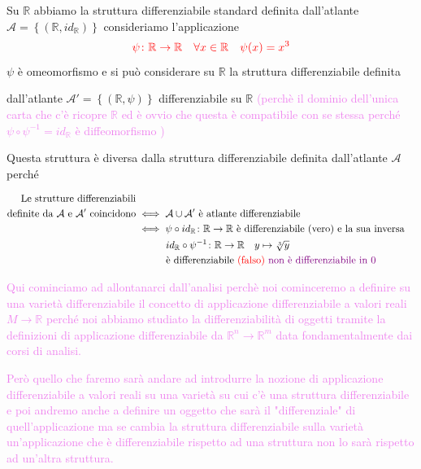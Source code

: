         \newpage 
        \begin{esempio}[$\mathbb{R}$]
        \mbox{}
        
        Su $\mathbb{R}$ abbiamo la struttura differenziabile standard definita dall'atlante $\mathcal{A}= \left\{(\mathbb{R} , id_{\mathbb{R}})\right\}$ consideriamo l'applicazione
        \[ \color{red} \psi \colon \mathbb{R} \to \mathbb{R} \quad \forall x \in \mathbb{R} \quad \psi (x) = x^3 \]
        $\psi$ è omeomorfismo e si può considerare su $\mathbb{R}$ la struttura differenziabile definita 

        dall'atlante $\mathcal{A}'= \left\{ \left( \mathbb{R}, \psi \right) \right\}$ differenziabile su $\mathbb{R}$ \textcolor{violet}{(perchè il dominio dell'unica carta
        che c'è ricopre $\mathbb{R}$ ed è ovvio che questa è compatibile con se stessa perché $\psi \circ \psi^{-1} = id_{\mathbb{R}}$ è diffeomorfismo )}

        Questa struttura è diversa dalla struttura differenziabile definita dall'atlante $\mathcal{A}$ perché

        \textcolor{verde}{$\begin{aligned}
        \text{Le strutture differenziabili} \\ \text{definite da } \mathcal{A} \text{ e } \mathcal{A}' \text{ coincidono} &\iff  \mathcal{A} \cup \mathcal{A}' \text{ è atlante differenziabile} \\
        &\iff \psi \circ id_{\mathbb{R}} \colon \mathbb{R} \to \mathbb{R} \text{ è differenziabile \textcolor{black}{(vero)} e la sua inversa} \\
        & \qquad \quad id_{\mathbb{R}} \circ \psi^{-1} \colon \mathbb{R} \to \mathbb{R} \quad y \mapsto \sqrt[3]{y} \\ 
        &\qquad \quad \text{è differenziabile \textcolor{red}{(falso)} \textcolor{violet}{non è differenziabile in 0}}
        \end{aligned}$}

        \textcolor{violet}{Qui cominciamo ad allontanarci dall'analisi perchè noi cominceremo a definire su una varietà differenziabile il concetto 
        di applicazione differenziabile a valori reali $M \to \mathbb{R}$ perché noi abbiamo studiato la differenziabilità di oggetti tramite la definizioni di applicazione 
        differenziabile da $\mathbb{R}^n \to \mathbb{R}^m$ data fondamentalmente dai corsi di analisi.}
        
        \textcolor{violet}{Però quello che faremo sarà andare ad introdurre la nozione di applicazione differenziabile a valori reali su una varietà su cui c'è una struttura 
        differenziabile e poi andremo anche a definire un oggetto che sarà il "differenziale" di quell'applicazione ma se cambia la struttura differenziabile sulla varietà un'applicazione che 
        è differenziabile rispetto ad una struttura non lo sarà rispetto ad un'altra struttura.}
        \end{esempio}
